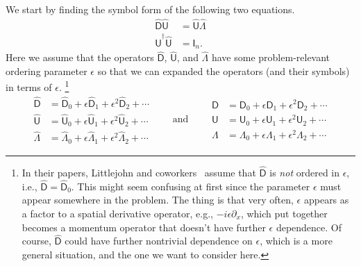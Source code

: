 We start by finding the symbol form of the following two equations.
%
\begin{equation}
  \begin{aligned}
    \hat{\mathsf{D}}\hat{\mathsf{U}} &= \hat{\mathsf{U}}\hat{\Lambda}\\
    \hat{\mathsf{U}}^{\dagger}\hat{\mathsf{U}} &= \mathsf{I}_{n}.
  \end{aligned}
\end{equation}
%
Here we assume that the operators $\hat{\mathsf{D}}$, $\hat{\mathsf{U}}$, and $\hat{\Lambda}$ have some problem-relevant ordering parameter $\epsilon$ so that we can expanded the operators (and their symbols) in terms of $\epsilon$.%
\footnote{In their papers, Littlejohn and coworkers~\cite{littlejohn1991,weigert1993} assume that $\hat{\mathsf{D}}$ is \emph{not} ordered in $\epsilon$, i.e., $\hat{\mathsf{D}} = \hat{\mathsf{D}}_{0}$.
  This might seem confusing at first since the parameter $\epsilon$ must appear somewhere in the problem.
  The thing is that very often, $\epsilon$ appears as a factor to a spatial derivative operator, e.g., $-i\epsilon\partial_{x}$, which put together becomes a momentum operator that doesn't have further $\epsilon$ dependence.
  Of course, $\hat{\mathsf{D}}$ could have further nontrivial dependence on $\epsilon$, which is a more general situation, and the one we want to consider here.
}
%
\begin{equation}
  \begin{aligned}
    \hat{\mathsf{D}} &= \hat{\mathsf{D}}_{0} + \epsilon\hat{\mathsf{D}}_{1} + \epsilon^{2}\hat{\mathsf{D}}_{2} + \cdots\\
    \hat{\mathsf{U}} &= \hat{\mathsf{U}}_{0} + \epsilon\hat{\mathsf{U}}_{1} + \epsilon^{2}\hat{\mathsf{U}}_{2} + \cdots\\
    \hat{\Lambda} &= \hat{\mathsf\Lambda}_{0} + \epsilon\hat{\mathsf\Lambda}_{1} + \epsilon^{2}\hat{\mathsf\Lambda}_{2} + \cdots
  \end{aligned}
  \qquad\text{and}\qquad
  \begin{aligned}
    {\mathsf{D}} &= {\mathsf{D}}_{0} + \epsilon{\mathsf{D}}_{1} + \epsilon^{2}{\mathsf{D}}_{2} + \cdots\\
    {\mathsf{U}} &= {\mathsf{U}}_{0} + \epsilon{\mathsf{U}}_{1} + \epsilon^{2}{\mathsf{U}}_{2} + \cdots\\
    {\Lambda} &= {\mathsf\Lambda}_{0} + \epsilon{\mathsf\Lambda}_{1} + \epsilon^{2}{\mathsf\Lambda}_{2} + \cdots
  \end{aligned}
\end{equation}
